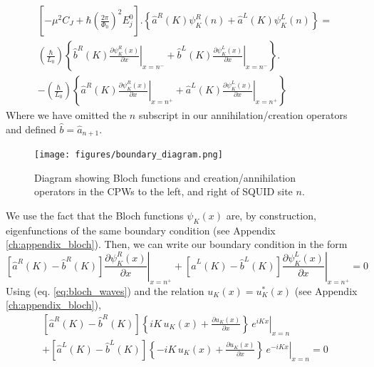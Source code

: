 \begin{equation}\label{eq:BC_static_1}
\begin{split}
    \left[-\mu^2 C_{J}+\hbar\left(\frac{2 \pi}{\Phi_{0}}\right)^{2} E_{j}^0\right].
    \left\lbrace\hat{a}^R(K) \psi^R_K(n) + \hat{a}^L(K) \psi^L_K(n) \right\rbrace =
    \\[2mm]
       \left(\frac{\hbar}{L_0}\right) 
    \left\lbrace\hat{b}^R(K) \left.\frac{\partial \psi^R_K(x)}{\partial x}\right|_{x=n^-} +\hat{b}^L(K) \left.\frac{\partial \psi^L_K(x)}{\partial x}\right|_{x=n^-}\right\rbrace.
    \\[2mm]
    -
    \left(\frac{\hbar}{L_0}\right) 
    \left\lbrace\hat{a}^R(K) \left.\frac{\partial \psi^R_K(x)}{\partial x}\right|_{x=n^+} +\hat{a}^L(K) \left.\frac{\partial \psi^L_K(x)}{\partial x}\right|_{x=n^+} \right\rbrace
\end{split}
\end{equation}
%
Where we have omitted the $n$ subscript in our annihilation/creation operators and defined $\hat{b} = \hat{a}_{n+1}$.
%
\begin{figure}\label{fig:boundary_schematic}
    \centering
    \texttt{[image: figures/boundary\_diagram.png]}
    \caption{Diagram showing Bloch functions and creation/annihilation operators in the CPWs to the left, and right of SQUID site $n$.}
\end{figure}
%
We use the fact that the Bloch functions $\psi_K(x)$ are, by construction, eigenfunctions of the same boundary condition (see Appendix \ref{ch:appendix_bloch}). Then, we can write our boundary condition in the form
%
\begin{equation}
    \left[\hat{a}^R(K) - \hat{b}^R(K)\right]\left.\frac{\partial \psi^R_K(x)}{\partial x}\right|_{x=n^+}
    +
    \left[\hat{a}^L(K) - \hat{b}^L(K)\right]\left.\frac{\partial \psi^L_K(x)}{\partial x}\right|_{x=n^+} = 0 
\end{equation}
%
Using (eq. \ref{eq:bloch_waves}) and the relation $u_K(x) = u^*_K(x)$ (see Appendix \ref{ch:appendix_bloch}),
%
\begin{equation}\label{eq:BC_static_2}
\begin{split}
    \left[\hat{a}^R(K) - \hat{b}^R(K)\right]
    \left.
    \left\lbrace
    i K \, u_K(x) + \frac{\partial u_K(x)}{\partial x}
    \right\rbrace
    \,e^{i K x}
    \right|_{x=n}
    \\[2mm]
    +
    \left[\hat{a}^L(K) - \hat{b}^L(K)\right]
    \left.
    \left\lbrace
    -i K\, u_K(x) + \frac{\partial u_K(x)}{\partial x}
    \right\rbrace
    \,e^{-i K x} 
    \right|_{x=n}
    = 0 
\end{split}
\end{equation}
